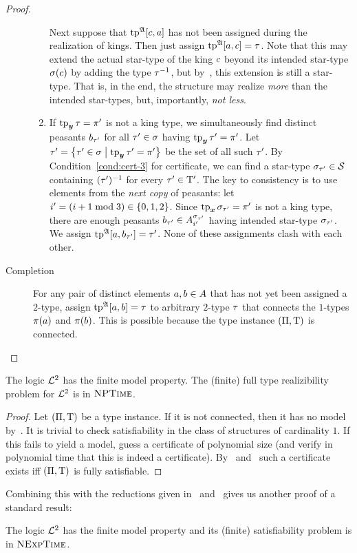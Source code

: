 \begin{proof}
\begin{description}
\begin{enumerate}
    Next suppose that $\operatorname{tp}^{\mathfrak{A}}[c,a]$ has not been assigned during the
    realization of kings. Then just assign $\operatorname{tp}^{\mathfrak{A}}[a,c] = \tau$.
    Note that this may extend the actual star-type of the king $c$ beyond its
    intended star-type $\sigma(c)$ by adding the type $\tau^{-1}$, but
    by~, this extension is still a star-type. That is,
    in the end, the structure may realize \emph{more} than the intended
    star-types, but, importantly, \emph{not less}.
    \item If $\operatorname{tp}_{\bm{y}}\tau = {\pi'}$ is not a king type, we simultaneously find
    distinct peasants $b_{{\tau'}}$ for all ${\tau'} \in \sigma$ having
    $\operatorname{tp}_{\bm{y}}{\tau'} = {\pi'}$.
    Let ${\tau'} = \left\{{\tau'} \in \sigma\mathrel{}\middle|\mathrel{}\operatorname{tp}_{\bm{y}}{\tau'} = {\pi'}\right\}$ be the set of
    all such ${\tau'}$.
    By Condition~\ref{cond:cert-3} for certificate, we can find a star-type
    $\sigma_{\tau'} \in \mathcal{S}$ containing $({\tau'})^{-1}$ for every ${\tau'} \in
    {\mathrm{T}'}$. The key to consistency is to use elements from the \emph{next copy}
    of peasants: let $i' = (i+1 \bmod 3) \in \left\{0,1,2\right\}$. Since
    $\operatorname{tp}_{\bm{x}}\sigma_{{\tau'}} = {\pi'}$ is not a king type, there are enough
    peasants ${b_{\tau'}} \in A_{i'}^{\sigma_{{\tau'}}}$ having intended
    star-type $\sigma_{{\tau'}}$. We assign $\operatorname{tp}^{\mathfrak{A}}[a,b_{\tau'}] = {\tau'}$.
    None of these assignments clash with each other.
  \end{enumerate}
  \item[Completion] For any pair of distinct elements $a, b \in A$ that
  has not yet been assigned a $2$-type, assign $\operatorname{tp}^{\mathfrak{A}}[a,b] = \tau$ to
  arbitrary $2$-type $\tau$ that connects the $1$-types $\pi(a)$ and
  $\pi(b)$. This is possible because the type instance $(\Pi,\mathrm{T})$ is
  connected.
\end{description}
\end{proof}

\begin{proposition}
The logic $\mathcal{L}^{2}$ has the finite model property. The (finite) full type
realizibility problem for $\mathcal{L}^{2}$ is in $\text{\normalfont{\scshape NPTime}}$.
\end{proposition}
\begin{proof}
Let $(\Pi,\mathrm{T})$ be a type instance. If it is not connected, then it has no
model by~. It is trivial to check satisfiability in
the class of structures of cardinality $1$. If this fails to yield a model,
guess a certificate of polynomial size (and verify in polynomial time that this
is indeed a certificate).
By~ and~ such a certificate exists
iff $(\Pi,\mathrm{T})$ is fully satisfiable.
\end{proof}
Combining this with the reductions given in~
and~ gives us another proof of a standard result:
\begin{corollary}
The logic $\mathcal{L}^{2}$ has the finite model property and its (finite) satisfiability
problem is in $\text{\normalfont{\scshape NExpTime}}$.
\end{corollary}
